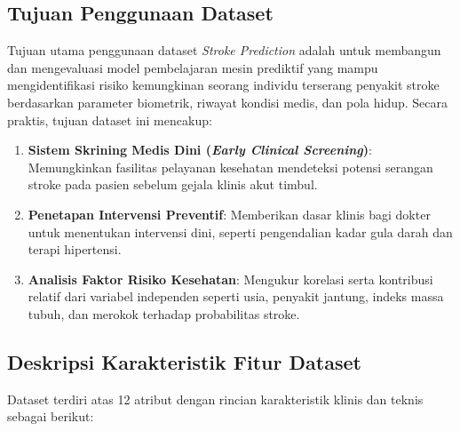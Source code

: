 \documentclass[a4paper,oneside,12pt]{report}
\begin{document}
\subsection{Tujuan Penggunaan Dataset}
Tujuan utama penggunaan dataset \textit{Stroke Prediction} adalah untuk membangun dan mengevaluasi model pembelajaran mesin prediktif yang mampu mengidentifikasi risiko kemungkinan seorang individu terserang penyakit stroke berdasarkan parameter biometrik, riwayat kondisi medis, dan pola hidup. Secara praktis, tujuan dataset ini mencakup:
\begin{enumerate}
    \item \textbf{Sistem Skrining Medis Dini (\textit{Early Clinical Screening})}: Memungkinkan fasilitas pelayanan kesehatan mendeteksi potensi serangan stroke pada pasien sebelum gejala klinis akut timbul.
    \item \textbf{Penetapan Intervensi Preventif}: Memberikan dasar klinis bagi dokter untuk menentukan intervensi dini, seperti pengendalian kadar gula darah dan terapi hipertensi.
    \item \textbf{Analisis Faktor Risiko Kesehatan}: Mengukur korelasi serta kontribusi relatif dari variabel independen seperti usia, penyakit jantung, indeks massa tubuh, dan merokok terhadap probabilitas stroke.
\end{enumerate}

\subsection{Deskripsi Karakteristik Fitur Dataset}
Dataset terdiri atas 12 atribut dengan rincian karakteristik klinis dan teknis sebagai berikut:
\end{document}
